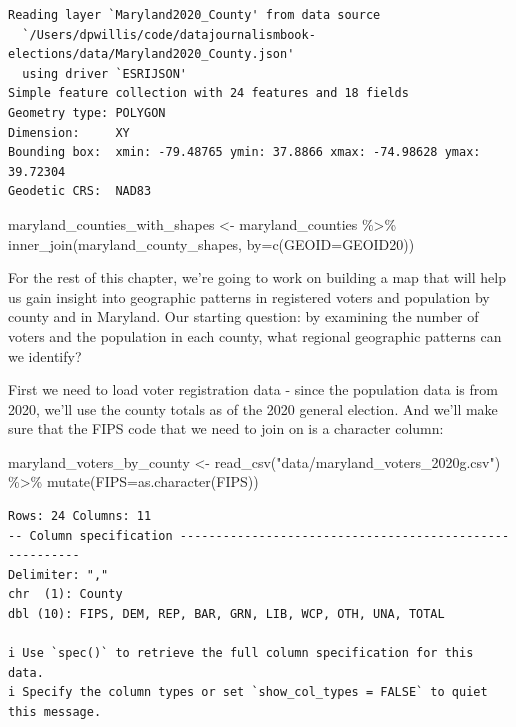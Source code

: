 \documentclass[
  letterpaper,
  DIV=11,
  numbers=noendperiod]{scrreprt}
\newenvironment{Shaded}{\begin{snugshade}}{\end{snugshade}}
\newcommand{\AttributeTok}[1]{\textcolor[rgb]{0.40,0.45,0.13}{#1}}
\newcommand{\FunctionTok}[1]{\textcolor[rgb]{0.28,0.35,0.67}{#1}}
\newcommand{\NormalTok}[1]{\textcolor[rgb]{0.00,0.23,0.31}{#1}}
\newcommand{\OtherTok}[1]{\textcolor[rgb]{0.00,0.23,0.31}{#1}}
\newcommand{\SpecialCharTok}[1]{\textcolor[rgb]{0.37,0.37,0.37}{#1}}
\newcommand{\StringTok}[1]{\textcolor[rgb]{0.13,0.47,0.30}{#1}}
\begin{document}
\begin{verbatim}
Reading layer `Maryland2020_County' from data source 
  `/Users/dpwillis/code/datajournalismbook-elections/data/Maryland2020_County.json' 
  using driver `ESRIJSON'
Simple feature collection with 24 features and 18 fields
Geometry type: POLYGON
Dimension:     XY
Bounding box:  xmin: -79.48765 ymin: 37.8866 xmax: -74.98628 ymax: 39.72304
Geodetic CRS:  NAD83
\end{verbatim}

\begin{Shaded}
\begin{Highlighting}[]
\NormalTok{maryland\_counties\_with\_shapes }\OtherTok{\textless{}{-}}\NormalTok{ maryland\_counties }\SpecialCharTok{\%\textgreater{}\%} \FunctionTok{inner\_join}\NormalTok{(maryland\_county\_shapes, }\AttributeTok{by=}\FunctionTok{c}\NormalTok{(}\StringTok{\textquotesingle{}GEOID\textquotesingle{}}\OtherTok{=}\StringTok{\textquotesingle{}GEOID20\textquotesingle{}}\NormalTok{))}
\end{Highlighting}
\end{Shaded}

For the rest of this chapter, we're going to work on building a map that
will help us gain insight into geographic patterns in registered voters
and population by county and in Maryland. Our starting question: by
examining the number of voters and the population in each county, what
regional geographic patterns can we identify?

First we need to load voter registration data - since the population
data is from 2020, we'll use the county totals as of the 2020 general
election. And we'll make sure that the FIPS code that we need to join on
is a character column:

\begin{Shaded}
\begin{Highlighting}[]
\NormalTok{maryland\_voters\_by\_county }\OtherTok{\textless{}{-}} \FunctionTok{read\_csv}\NormalTok{(}\StringTok{"data/maryland\_voters\_2020g.csv"}\NormalTok{) }\SpecialCharTok{\%\textgreater{}\%} \FunctionTok{mutate}\NormalTok{(}\AttributeTok{FIPS=}\FunctionTok{as.character}\NormalTok{(FIPS))}
\end{Highlighting}
\end{Shaded}

\begin{verbatim}
Rows: 24 Columns: 11
-- Column specification --------------------------------------------------------
Delimiter: ","
chr  (1): County
dbl (10): FIPS, DEM, REP, BAR, GRN, LIB, WCP, OTH, UNA, TOTAL

i Use `spec()` to retrieve the full column specification for this data.
i Specify the column types or set `show_col_types = FALSE` to quiet this message.
\end{verbatim}
\end{document}
